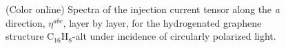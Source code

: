 \documentclass[pss]{wiley2sp} %
\begin{document}
\begin{figure}[t]
  \centering
  \\
  \\
  \caption{(Color online) Spectra of the injection current tensor along the \emph{a} direction, {$\eta^{abc}$}, layer by layer, for the hydrogenated graphene structure C$_{16}$H$_{8}$-alt under incidence of circularly polarized light.\label{fig:alt-eta}}
\end{figure}
\end{document}
